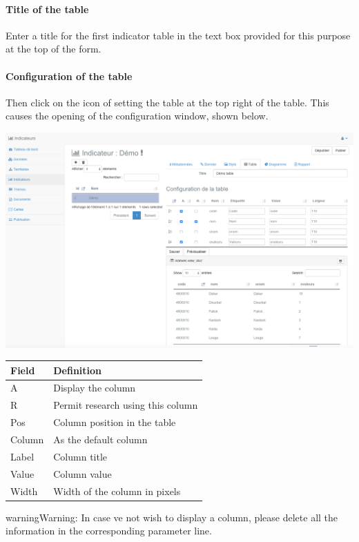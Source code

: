 \documentclass[letterpaper,10pt,english]{sphinxmanual}
\begin{document}
\paragraph{Title of the table}

Enter a title for the first indicator table in the text box provided for this purpose at the top of the form.
\paragraph{Configuration of the table}

Then click on the icon of setting the table at the top right of the table. This causes the opening of the configuration window, shown below.

\includegraphics[width=1.000\linewidth]{set-table-parameters-window.png}

\begin{tabulary}{\linewidth}{|L|L|}
\hline

\textbf{Field}
 & 
\textbf{Definition}
\\
\hline
A
 & 
Display the column
\\
\hline
R
 & 
Permit research using this column
\\
\hline
Pos
 & 
Column position in the table
\\
\hline
Column
 & 
As the default column
\\
\hline
Label
 & 
Column title
\\
\hline
Value
 & 
Column value
\\
\hline
Width
 & 
Width of the column in pixels
\\
\hline\end{tabulary}


\begin{notice}{warning}{Warning:}
In case ve not wish to display a column, please delete all the information in the corresponding parameter line.
\end{notice}
\end{document}

